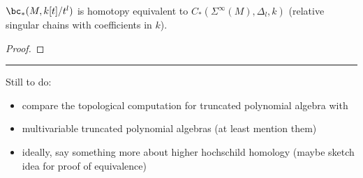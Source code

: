\begin{prop}
$\bc_*(M, k[t]/t^l)$ is homotopy equivalent to $C_*(\Sigma^\infty(M), \Delta_l, k)$
(relative singular chains with coefficients in $k$).
\end{prop}

\begin{proof}
\end{proof}

\medskip
\hrule
\medskip

Still to do:
\begin{itemize}
\item compare the topological computation for truncated polynomial algebra with \cite{MR1600246}
\item multivariable truncated polynomial algebras (at least mention them)
\item ideally, say something more about higher hochschild homology (maybe sketch idea for proof of equivalence)
\end{itemize}

